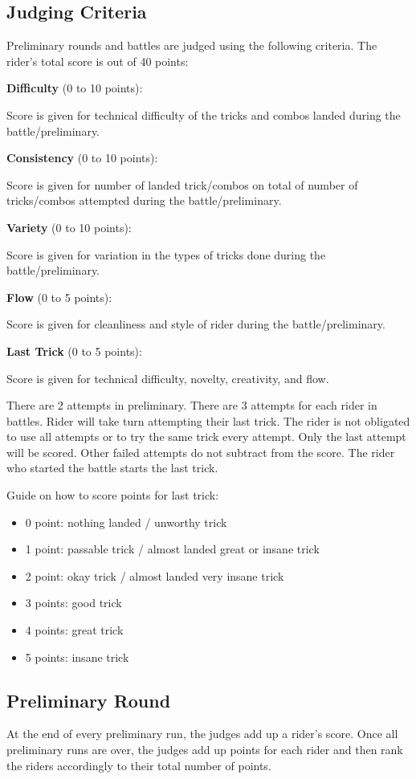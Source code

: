 \subsection{Judging Criteria}

Preliminary rounds and battles are judged using the following criteria.
The rider's total score is out of 40 points:

\textbf{Difficulty} (0 to 10 points):

Score is given for technical difficulty of the tricks and combos landed during the battle/preliminary.

\textbf{Consistency} (0 to 10 points):

Score is given for number of landed trick/combos on total of number of tricks/combos attempted during the battle/preliminary.

\textbf{Variety} (0 to 10 points):

Score is given for variation in the types of tricks done during the battle/preliminary.

\textbf{Flow} (0 to 5 points):

Score is given for cleanliness and style of rider during the battle/preliminary.

\textbf{Last Trick} (0 to 5 points):

Score is given for technical difficulty, novelty, creativity, and flow.

There are 2 attempts in preliminary. 
There are 3 attempts for each rider in battles. Rider will take turn attempting their last trick. The rider is not obligated to use all attempts or to try the same trick every attempt.
Only the last attempt will be scored.
Other failed attempts do not subtract from the score. The rider who started the battle starts the last trick.

Guide on how to score points for last trick:
\begin{itemize}
\item 0 point: nothing landed / unworthy trick
\item 1 point: passable trick / almost landed great or insane trick
\item 2 point: okay trick / almost landed very insane trick
\item 3 points: good trick
\item 4 points: great trick
\item 5 points: insane trick
\end{itemize}

\subsection{Preliminary Round}
At the end of every preliminary run, the judges add up a rider's score.
Once all preliminary runs are over, the judges add up points for each rider and then rank the riders accordingly to their total number of points.


